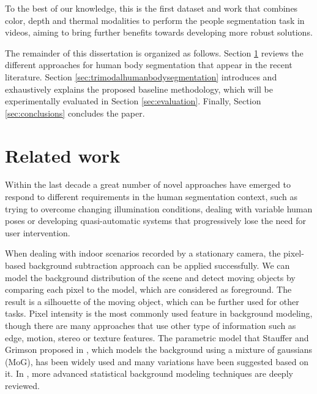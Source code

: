 \documentclass[10pt,twocolumn,letterpaper]{article}
\begin{document}
To the best of our knowledge, this is the first dataset and work that combines color, depth and thermal modalities to perform the people segmentation task in videos, aiming to bring further benefits towards developing more robust solutions.

The remainder of this dissertation is organized as follows. Section \ref{sec:relatedwork} reviews the different approaches for human body segmentation that appear in the recent literature. Section \ref{sec:trimodalhumanbodysegmentation} introduces and exhaustively explains the proposed baseline methodology, which will be experimentally evaluated in Section \ref{sec:evaluation}. Finally, Section \ref{sec:conclusions} concludes the paper.

\section{Related work}
\label{sec:relatedwork}

Within the last decade a great number of novel approaches have emerged to respond to different requirements in the human segmentation context, such as trying to overcome changing illumination conditions, dealing with variable human poses or developing quasi-automatic systems that progressively lose the need for user intervention.
 
 When dealing with indoor scenarios recorded by a stationary camera, the pixel-based background subtraction approach can be applied successfully. We can model the background distribution of the scene and detect moving objects by comparing each pixel to the model, which are considered as foreground. The result is a silhouette of the moving object, which can be further used for other tasks. Pixel intensity is the most commonly used feature in background modeling, though there are many approaches that use other type of information such as edge, motion, stereo or texture features. The parametric model that Stauffer and Grimson proposed in \cite{stauffer1999adaptive}, which models the background using a mixture of gaussians (MoG), has been widely used and many variations have been suggested based on it. In \cite{bouwmans2011recent}, more advanced statistical background modeling techniques are deeply reviewed. 
 
\end{document}
